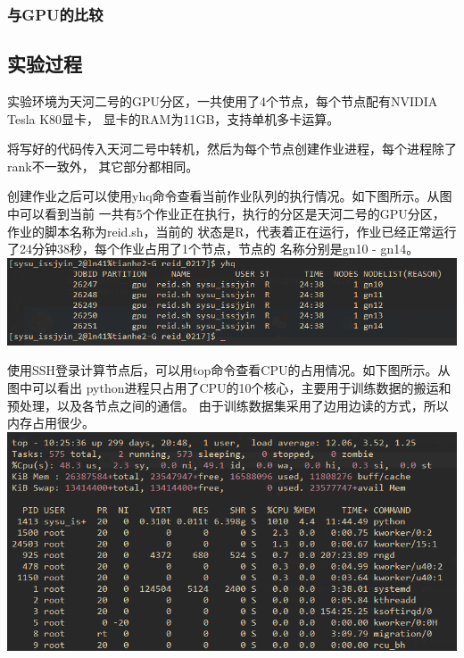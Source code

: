\subsubsection{与GPU的比较}

\subsection{实验过程}
实验环境为天河二号的GPU分区，一共使用了4个节点，每个节点配有NVIDIA Tesla K80显卡，
显卡的RAM为11GB，支持单机多卡运算。

将写好的代码传入天河二号中转机，然后为每个节点创建作业进程，每个进程除了rank不一致外，
其它部分都相同。

创建作业之后可以使用yhq命令查看当前作业队列的执行情况。如下图所示。从图中可以看到当前
一共有5个作业正在执行，执行的分区是天河二号的GPU分区，作业的脚本名称为reid.sh，当前的
状态是R，代表着正在运行，作业已经正常运行了24分钟38秒，每个作业占用了1个节点，节点的
名称分别是gn10 - gn14。\\[0.5cm]
\includegraphics[width=1\textwidth]{figure/yhq}

使用SSH登录计算节点后，可以用top命令查看CPU的占用情况。如下图所示。从图中可以看出
python进程只占用了CPU的10个核心，主要用于训练数据的搬运和预处理，以及各节点之间的通信。
由于训练数据集采用了边用边读的方式，所以内存占用很少。\\[0.5cm]
\includegraphics[width=1\textwidth]{figure/top}


